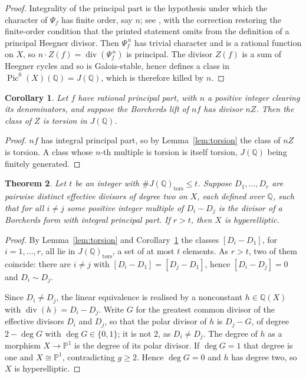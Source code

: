 \documentclass[11pt,reqno]{amsart}
\theoremstyle{plain}
\newtheorem{theorem}{Theorem}
\newtheorem{corollary}[theorem]{Corollary}
\theoremstyle{definition}
\DeclareMathOperator{\Pic}{Pic}
\DeclareMathOperator{\divisor}{div}
\newcommand{\Q}{\mathbb{Q}}
\newcommand{\PP}{\mathbb{P}}
\begin{document}
\begin{proof}
Integrality of the principal part is the hypothesis under which the character of $\Psi_f$ has
finite order, say $n$; see \cite[proof of Theorem 4.1]{borcherds-gkz}, with the correction
\cite{borcherds-correction} restoring the finite-order condition that the printed statement omits
from the definition of a principal Heegner divisor. Then $\Psi_f^{\,n}$ has trivial character and
is a rational function on $X$, so $n \cdot Z(f) = \divisor(\Psi_f^{\,n})$ is principal. The divisor
$Z(f)$ is a sum of Heegner cycles and so is Galois-stable, hence defines a class in
$\Pic^0(X)(\Q) = J(\Q)$, which is therefore killed by $n$.
\end{proof}

\begin{corollary}\label{cor:rational}
Let $f$ have \emph{rational} principal part, with $n$ a positive integer clearing its
denominators, and suppose the Borcherds lift of $nf$ has divisor $n Z$. Then the class of $Z$ is
torsion in $J(\Q)$.
\end{corollary}

\begin{proof}
$nf$ has integral principal part, so by Lemma~\ref{lem:torsion} the class of $nZ$ is torsion. A
class whose $n$-th multiple is torsion is itself torsion, $J(\Q)$ being finitely generated.
\end{proof}

\begin{theorem}\label{thm:count}
Let $t$ be an integer with $\#J(\Q)_{\mathrm{tors}} \le t$. Suppose $D_1, \dots, D_r$ are pairwise
distinct effective divisors of degree two on $X$, each defined over $\Q$, such that for all $i \ne
j$ some positive integer multiple of $D_i - D_j$ is the divisor of a Borcherds form with integral
principal part. If $r > t$, then $X$ is hyperelliptic.
\end{theorem}

\begin{proof}
By Lemma~\ref{lem:torsion} and Corollary~\ref{cor:rational} the classes $[D_i - D_1]$, for
$i = 1, \dots, r$, all lie in
$J(\Q)_{\mathrm{tors}}$, a set of at most $t$ elements. As $r > t$, two of them coincide: there are
$i \ne j$ with $[D_i - D_1] = [D_j - D_1]$, hence $[D_i - D_j] = 0$ and $D_i \sim D_j$.

Since $D_i \ne D_j$, the linear equivalence is realised by a nonconstant $h \in \Q(X)$ with
$\divisor(h) = D_i - D_j$. Write $G$ for the greatest common divisor of the effective divisors $D_i$
and $D_j$, so that the polar divisor of $h$ is $D_j - G$, of degree $2 - \deg G$ with $\deg G \in
\{0, 1\}$; it is not $2$, as $D_i \neq D_j$. The degree of $h$ as a morphism $X \to \PP^1$ is the
degree of its polar divisor. If $\deg G = 1$ that degree is one and $X \cong \PP^1$, contradicting
$g \ge 2$. Hence $\deg G = 0$ and $h$ has degree two, so $X$ is hyperelliptic.
\end{proof}
\end{document}
